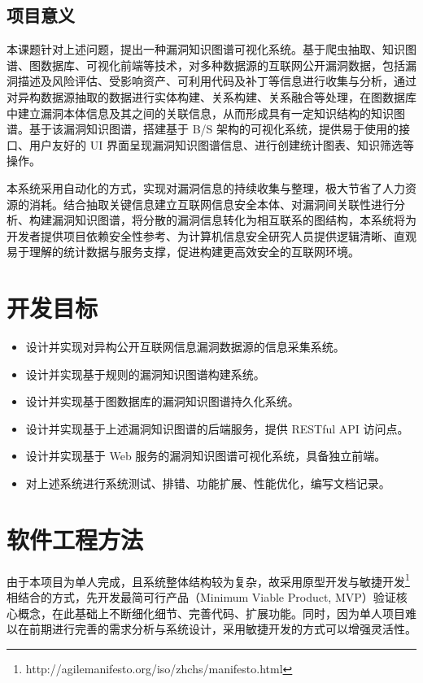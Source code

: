 \documentclass[a4paper,AutoFakeBold,oneside,12pt]{book}
\begin{document}
\subsection{项目意义}

本课题针对上述问题，提出一种漏洞知识图谱可视化系统。基于爬虫抽取、知识图谱、图数据库、可视化前端等技术，对多种数据源的互联网公开漏洞数据，包括漏洞描述及风险评估、受影响资产、可利用代码及补丁等信息进行收集与分析，通过对异构数据源抽取的数据进行实体构建、关系构建、关系融合等处理，在图数据库中建立漏洞本体信息及其之间的关联信息，从而形成具有一定知识结构的知识图谱。基于该漏洞知识图谱，搭建基于 B/S 架构的可视化系统，提供易于使用的接口、用户友好的 UI 界面呈现漏洞知识图谱信息、进行创建统计图表、知识筛选等操作。

本系统采用自动化的方式，实现对漏洞信息的持续收集与整理，极大节省了人力资源的消耗。结合抽取关键信息建立互联网信息安全本体、对漏洞间关联性进行分析、构建漏洞知识图谱，将分散的漏洞信息转化为相互联系的图结构，本系统将为开发者提供项目依赖安全性参考、为计算机信息安全研究人员提供逻辑清晰、直观易于理解的统计数据与服务支撑，促进构建更高效安全的互联网环境。

\section{开发目标}

\begin{itemize}
	\item 设计并实现对异构公开互联网信息漏洞数据源的信息采集系统。
	\item 设计并实现基于规则的漏洞知识图谱构建系统。
	\item 设计并实现基于图数据库的漏洞知识图谱持久化系统。
	\item 设计并实现基于上述漏洞知识图谱的后端服务，提供 RESTful API 访问点。
	\item 设计并实现基于 Web 服务的漏洞知识图谱可视化系统，具备独立前端。
	\item 对上述系统进行系统测试、排错、功能扩展、性能优化，编写文档记录。
\end{itemize}

\section{软件工程方法}

由于本项目为单人完成，且系统整体结构较为复杂，故采用原型开发与敏捷开发\footnote{http://agilemanifesto.org/iso/zhchs/manifesto.html}相结合的方式，先开发最简可行产品（Minimum Viable Product, MVP）验证核心概念，在此基础上不断细化细节、完善代码、扩展功能。同时，因为单人项目难以在前期进行完善的需求分析与系统设计，采用敏捷开发的方式可以增强灵活性。
\end{document}
